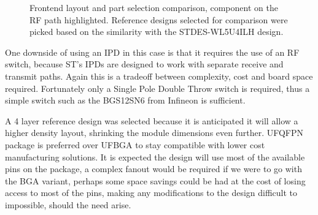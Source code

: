 \begin{figure}
    \centering
     \hfill
    \hfill
    \caption{\label{fig:frontend-comparison} Frontend layout and part selection comparison, component on the RF path highlighted. Reference designs selected for comparison were picked based on the similarity with the STDES-WL5U4ILH design.}
\end{figure}

One downside of using an IPD in this case is that it requires the use of an RF switch, because ST's IPDs are designed to work with separate receive and transmit paths. Again this is a tradeoff between complexity, cost and board space required. Fortunately only a Single Pole Double Throw switch is required, thus a simple switch such as the BGS12SN6 from Infineon is sufficient.

A 4 layer reference design was selected because it is anticipated it will allow a higher density layout, shrinking the module dimensions even further. UFQFPN package is preferred over UFBGA to stay compatible with lower cost manufacturing solutions. It is expected the design will use most of the available pins on the package, a complex fanout would be required if we were to go with the BGA variant, perhaps some space savings could be had at the cost of losing access to most of the pins, making any modifications to the design difficult to impossible, should the need arise.

